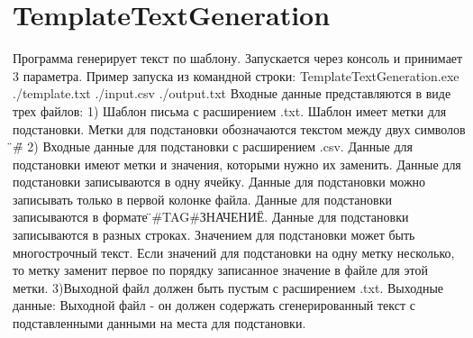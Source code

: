 \chapter{Template\+Text\+Generation}
\hypertarget{md__d_1_2_microsoft_01_v_s2022_2_template_text_generation_2_r_e_a_d_m_e}{}\label{md__d_1_2_microsoft_01_v_s2022_2_template_text_generation_2_r_e_a_d_m_e}
\label{md__d_1_2_microsoft_01_v_s2022_2_template_text_generation_2_r_e_a_d_m_e_autotoc_md0}%
%
Программа генерирует текст по шаблону. Запускается через консоль и принимает 3 параметра. Пример запуска из командной строки\+: Template\+Text\+Generation.\+exe ./template.txt ./input.csv ./output.txt Входные данные представляются в виде трех файлов\+: 1) Шаблон письма с расширением .txt. Шаблон имеет метки для подстановки. Метки для подстановки обозначаются текстом между двух символов \"{}\#\"{} 2) Входные данные для подстановки с расширением .csv. Данные для подстановки имеют метки и значения, которыми нужно их заменить. Данные для подстановки записываются в одну ячейку. Данные для подстановки можно записывать только в первой колонке файла. Данные для подстановки записываются в формате \"{}\#\+TAG\#ЗНАЧЕНИЕ\"{}. Данные для подстановки записываются в разных строках. Значением для подстановки может быть многострочный текст. Если значений для подстановки на одну метку несколько, то метку заменит первое по порядку записанное значение в файле для этой метки. 3)Выходной файл должен быть пустым с расширением .txt. Выходные данные\+: Выходной файл -\/ он должен содержать сгенерированный текст с подставленными данными на места для подстановки. 